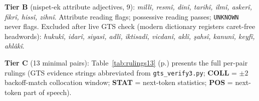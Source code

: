\documentclass[11pt]{article}
\begin{document}
\textbf{Tier B} (nispet-ek attribute adjectives, 9): \emph{mill{\^i}, resm{\^i}, din{\^i}, tarih{\^i}, ilm{\^i}, asker{\^i}, fikr{\^i}, hiss{\^i}, zihn{\^i}}. Attribute reading flags; possessive reading passes; \texttt{UNKNOWN} never flags. Excluded after live GTS check (modern dictionary registers caret-free headwords): \emph{hukuk{\^i}, idar{\^i}, siyas{\^i}, adl{\^i}, iktisad{\^i}, vicdan{\^i}, akl{\^i}, {\c s}ahs{\^i}, kanun{\^i}, keyf{\^i}, ahl{\^a}k{\^i}}.

\textbf{Tier C} (13 minimal pairs): Table~\ref{tab:rulings13} (p.\pageref{tab:rulings13}) presents the full per-pair rulings (GTS evidence strings abbreviated from \texttt{gts\_verify3.py}; \textbf{COLL} = $\pm2$ backoff-match collocation window; \textbf{STAT} = next-token statistics; \textbf{POS} = next-token part of speech).
\end{document}
